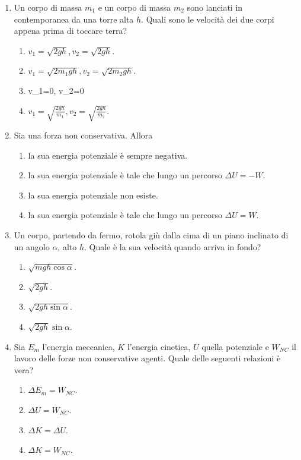 \documentclass{article}
\begin{document}
\begin{enumerate}
  \item Un corpo di massa $m_1$ e un corpo di massa $m_2$ sono lanciati in contemporanea da una torre alta $h$. Quali sono le velocità dei due corpi appena prima di toccare terra?
  \begin{enumerate}[label=\Alph*.]
    \item $v_1=\sqrt{2gh}, v_2=\sqrt{2gh}$.
    \item $v_1=\sqrt{2m_1gh}, v_2=\sqrt{2m_2gh}$.
    \item v_1=0, v_2=0
    \item $v_1=\sqrt{\frac{2gh}{m_1}}, v_2=\sqrt{\frac{2gh}{m_2}}$.
  \end{enumerate}
  \item Sia  una forza non conservativa. Allora
  \begin{enumerate}[label=\Alph*.]
    \item la sua energia potenziale è sempre negativa.
    \item la sua energia potenziale è tale che lungo un percorso $\Delta U=-W$.
    \item la sua energia potenziale non esiste.
    \item la sua energia potenziale è tale che lungo un percorso $\Delta U=W$.
  \end{enumerate}
  \item Un corpo, partendo da fermo, rotola giù dalla cima di un piano inclinato di un angolo $\alpha$, alto $h$. Quale è la sua velocità quando arriva in fondo?
  \begin{enumerate}[label=\Alph*.]
    \item $\sqrt{mgh\cos\alpha}$.
    \item $\sqrt{2gh}$.
    \item $\sqrt{2gh\sin\alpha}$.
    \item $\sqrt{2gh}\sin\alpha$.
  \end{enumerate}
  \item Sia $E_m$ l'energia meccanica, $K$ l'energia cinetica, $U$ quella potenziale e $W_{NC}$ il lavoro delle forze non conservative agenti. Quale delle seguenti relazioni è vera?
  \begin{enumerate}[label=\Alph*.]
    \item $\Delta E_m=W_{NC}$.
    \item $\Delta U=W_{NC}$.
    \item $\Delta K = \Delta U$.
    \item $\Delta K=W_{NC}.$

\end{enumerate}
\end{enumerate}
\end{document}
